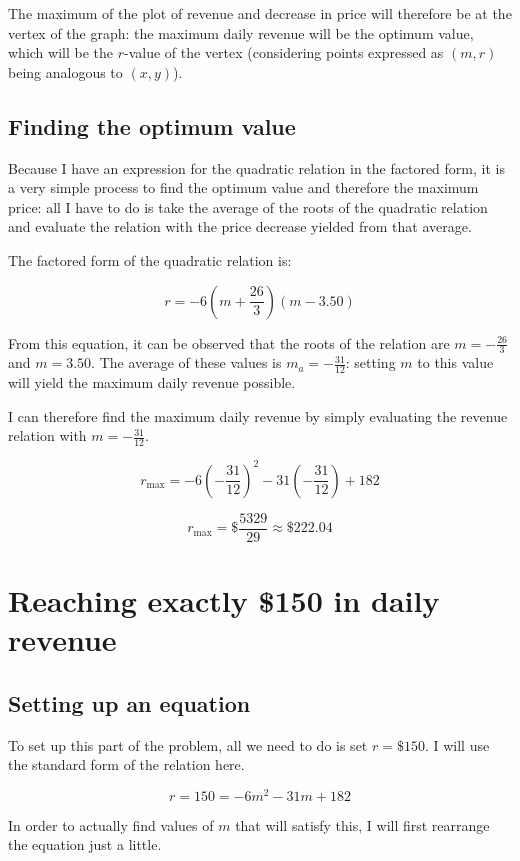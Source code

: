 \documentclass[12pt]{article}
\begin{document}
The maximum of the plot of revenue and decrease in price will therefore be at the vertex of the graph: the maximum daily revenue will be the optimum value, which will be the $r$-value of the vertex (considering points expressed as $(m, r)$ being analogous to $(x, y)$).

\subsection{Finding the optimum value}

Because I have an expression for the quadratic relation in the factored form, it is a very simple process to find the optimum value and therefore the maximum price: all I have to do is take the average of the roots of the quadratic relation and evaluate the relation with the price decrease yielded from that average.

The factored form of the quadratic relation is:

\[
r = -6\left(m + \frac{26}{3}\right)(m - 3.50)
\]

From this equation, it can be observed that the roots of the relation are $m = -\frac{26}{3}$ and $m = 3.50$.
The average of these values is $m_a = -\frac{31}{12}$: setting $m$ to this value will yield the maximum daily revenue possible.

I can therefore find the maximum daily revenue by simply evaluating the revenue relation with $m = -\frac{31}{12}$.

\[
r_{\text{max}} = -6\left(-\frac{31}{12}\right)^2 - 31\left(-\frac{31}{12}\right) + 182
\]

\[
r_{\text{max}} = \$\frac{5329}{29} \approx \boxed{\$222.04}
\]

\newpage

\section{Reaching exactly \$150 in daily revenue}

\subsection{Setting up an equation}

To set up this part of the problem, all we need to do is set $r = \$150$.
I will use the standard form of the relation here.

\[
r = 150 = -6m^2 - 31m + 182
\]

In order to actually find values of $m$ that will satisfy this, I will first rearrange the equation just a little.
\end{document}
